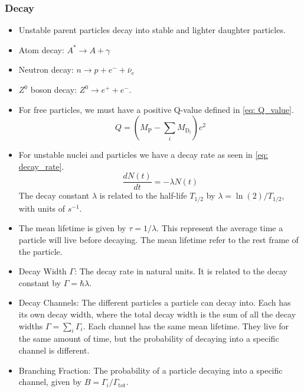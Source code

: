 \subsubsection{Decay}
\begin{itemize}
    \item Unstable parent particles decay into stable and lighter daughter particles. 
    \item Atom decay: $A^{*} → A + γ$
    \item Neutron decay: $n → p + e^{-} + \bar{ν}_{e}$
    \item $Z^{0}$ boson decay: $Z^{0} → e^{+} + e^{-}$. 
    \item For free particles, we must have a positive Q-value defined in \cref{eq: Q_value}.
    \begin{equation}\label{eq: Q_value}
        Q = \left(M_{\text{P}} - ∑_{i}^{} M_{\text{D}_i}\right)c^2
    \end{equation} 
    \item For unstable nuclei and particles we have a decay rate as seen in \cref{eq: decay_rate}.
    \begin{equation}\label{eq: decay_rate}
        \frac{dN(t)}{dt} = -λN(t)
    \end{equation}
    The decay constant $λ$ is related to the half-life $T_{1/2}$ by $λ = \ln(2) / T_{1/2}$, with units of $s^{-1}$. 
    \item The mean lifetime is given by $τ = 1 / λ$. This represent the average time a particle will live before decaying. The mean lifetime refer to the rest frame of the particle. 
    \item Decay Width $Γ$: The decay rate in natural units. It is related to the decay constant by $Γ = ℏλ$.
    \item Decay Channels: The different particles a particle can decay into. Each has its own decay width, where the total decay width is the sum of all the decay widths $Γ = ∑_{i}^{} Γ_i$. Each channel has the same mean lifetime. They live for the same amount of time, but the probability of decaying into a specific channel is different. 
    \item Branching Fraction: The probability of a particle decaying into a specific channel, given by $B = Γ_{i} / Γ_{\text{tot}}$.
\end{itemize}

